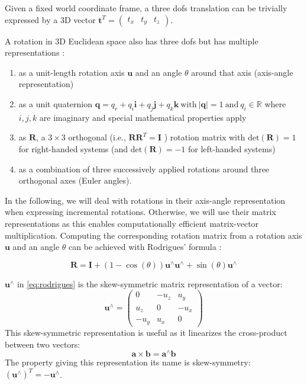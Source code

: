 \documentclass[headsepline, hidelinks, footsepline, footinclude=false, oneside, fontsize=11pt, paper=a4, listof=totoc, bibliography=totoc]{scrbook}
\begin{document}
Given a fixed world coordinate frame, a three \glspl{dof} translation can be trivially expressed by a 3D vector \(\mathbf{t}^T=\begin{pmatrix}t_x & t_y & t_z\end{pmatrix}\).

A rotation in 3D Euclidean space also has three \glspl{dof} but has multiple representations \cite{mccarthyIntroductionTheoreticalKinematics1990}:
\begin{enumerate}
\item as a unit-length rotation axis \(\mathbf{u}\) and an angle \(\theta\) around that axis (axis-angle representation)
\item as a unit quaternion \(\mathbf{q} = q_r + q_i\mathbf{i} + q_j\mathbf{j} + q_k\mathbf{k}~\text{with}~|\mathbf{q}|=1~\text{and}~q_i\in\mathbb{R}\) where \(i, j, k\) are imaginary and special mathematical properties apply
\item as \(\mathbf{R}\), a \(3\times3\) orthogonal (i.e., \(\mathbf{R}\mathbf{R}^T=\mathbf{I}\) \cite{murrayMathematicalIntroductionRobotic1994}) rotation matrix with \(\text{det}(\mathbf{R}) = 1\) for right-handed systems (and \(\text{det}(\mathbf{R}) = -1\) for left-handed systems)
\item as a combination of three successively applied rotations around three orthogonal axes (Euler angles).
\end{enumerate}

In the following, we will deal with rotations in their axis-angle representation when expressing incremental rotations. Otherwise, we will use their matrix representations as this enables computationally efficient matrix-vector multiplication.
Computing the corresponding rotation matrix from a rotation axis \(\mathbf{u}\) and an angle \(\theta\) can be achieved with Rodrigues' formula \cite{murrayMathematicalIntroductionRobotic1994}:

\begin{equation}
\label{eq:rodrigues}
\mathbf{R} = \mathbf{I} + (1-\cos(\theta))\mathbf{u}^\wedge\mathbf{u}^\wedge + \sin(\theta)\mathbf{u}^\wedge
\end{equation}

\(\mathbf{u}^{\wedge}\) in \cref{eq:rodrigues} is the skew-symmetric matrix representation of a vector:
\begin{equation}
\mathbf{u}^\wedge = \begin{pmatrix}0 & -u_z & u_y \\ u_z & 0 & -u_x \\ -u_y & u_x & 0 \end{pmatrix}
\end{equation}
This skew-symmetric representation is useful as it linearizes the cross-product between two vectors:
\begin{equation}
\mathbf{a} \times \mathbf{b} = \mathbf{a}^\wedge \mathbf{b}
\end{equation}
The property giving this representation its name is skew-symmetry: \((\mathbf{u}^\wedge)^T = -\mathbf{u}^\wedge\).
\end{document}
